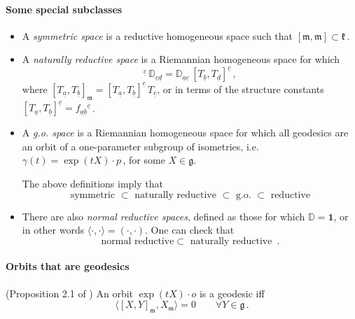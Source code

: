 \documentclass[11pt,a4paper]{article}
\def\ua{{\underline{a}}}
\def\ub{{\underline{b}}}
\def\uc{{\underline{c}}}
\def\ud{{\underline{d}}}
\def\Dperp{{\mathbb{D}}}
\begin{document}
\begin{itemize}
    \end{itemize}
    
    \paragraph{Some special subclasses}
    \begin{itemize}
    	\item A {\it symmetric space} is a reductive homogeneous space such that $[\mathfrak{m},\mathfrak{m}]\subset\mathfrak{k}$\,. 
    	\item A {\it naturally reductive space} is a Riemannian homogeneous space for which 
    	\begin{equation}
    	[T_\ua,T_\ub]^\uc\,\Dperp_{\uc\ud}=\Dperp_{\ua\uc}\,[T_\ub,T_\ud]^\uc\,,
    	\end{equation}
    	where $[T_\ua,T_\ub]_\mathfrak{m}=[T_\ua,T_\ub]^\uc\,T_\uc$, or in terms of the structure constants $[T_\ua,T_\ub]^\uc=f_{\ua\ub}{}^\uc$\,.
    	\item A {\it g.o.\! space} is a Riemannian homogeneous space for which all geodesics are an orbit of a one-parameter subgroup of isometries, i.e. $\gamma(t)=\exp(tX)\cdot p$\,, for some $X\in\mathfrak{g}$.
    	
    	
    	\noindent The above definitions imply that
    	\begin{equation*}
    	\mbox{symmetric }\subset \mbox{ naturally reductive }\subset\mbox{ g.o. }\subset\mbox{ reductive}\label{classif}
    	\end{equation*}
    	\item There are also {\it normal reductive spaces}, defined as those for which $\Dperp=\mathbf{1}$, or in other words $\langle\cdot,\cdot\rangle=\left(\cdot,\cdot\right)$. One can check that
    	\begin{equation}
    	\mbox{normal reductive}\subset \mbox{ naturally reductive }\,.
    	\end{equation}
    \end{itemize}
    
    
    
    \paragraph{Orbits that are geodesics} (Proposition 2.1 of \cite{KowVa}) An orbit $\exp(t X)\cdot o$ is a geodesic iff
    \begin{equation}
    \langle[X,Y]_\mathfrak{m},X_\mathfrak{m}\rangle=0\qquad \forall Y\in\mathfrak{g}\label{geovec}\,.
    \end{equation}
    
\end{document}
